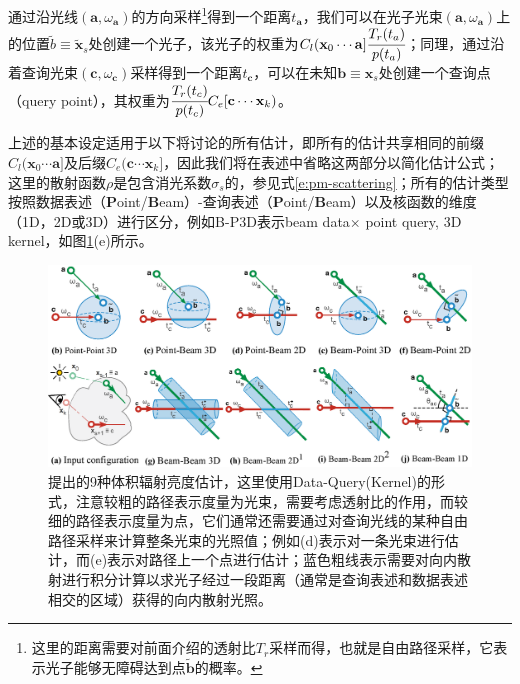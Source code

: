 通过沿光线$(\mathbf{a},\omega_{\mathbf{a}})$的方向采样\footnote{这里的距离需要对前面介绍的透射比$T_r$采样而得，也就是自由路径采样，它表示光子能够无障碍达到点$\tilde{\mathbf{b}}$的概率。}得到一个距离$t_{\mathbf{a}}$，我们可以在光子光束$(\mathbf{a},\omega_{\mathbf{a}})$上的位置$\tilde{b}\equiv\tilde{\mathbf{x}}_s$处创建一个光子，该光子的权重为$C_l(\mathbf{x}_0\cdots\mathbf{a}] \cfrac{T_r(t_a)}{p(t_a)}$；同理，通过沿着查询光束$(\mathbf{c},\omega_{\mathbf{c}})$采样得到一个距离$t_{\mathbf{c}}$，可以在未知$\mathbf{b}\equiv\mathbf{x}_s$处创建一个查询点（query point），其权重为$ \cfrac{T_r(t_c)}{p(t_c)}C_e[\mathbf{c}\cdots\mathbf{x}_k)$。

上述的基本设定适用于以下将讨论的所有估计，即所有的估计共享相同的前缀$C_l(\mathbf{x}_0\cdots\mathbf{a}]$及后缀$C_e(\mathbf{c}\cdots\mathbf{x}_k]$，因此我们将在表述中省略这两部分以简化估计公式；这里的散射函数$\rho$是包含消光系数$\sigma_s$的，参见式\ref{e:pm-scattering}；所有的估计类型按照数据表述（\textbf{P}oint/\textbf{B}eam）-查询表述（\textbf{P}oint/\textbf{B}eam）以及核函数的维度（1D，2D或3D）进行区分，例如B-P3D表示beam data$\times$ point query, 3D kernel，如图\ref{f:pm-estimators}(e)所示。
	
\begin{figure}
\begin{fullwidth}
	\includegraphics[width=1.0\thewidth]{figures/pm/estimators}
	\caption{\cite{a:AComprehensiveTheoryofVolumetricRadianceEstimationusingPhotonPointsandBeams}提出的9种体积辐射亮度估计，这里使用Data-Query(Kernel)的形式，注意较粗的路径表示度量为光束，需要考虑透射比的作用，而较细的路径表示度量为点，它们通常还需要通过对查询光线的某种自由路径采样来计算整条光束的光照值；例如(d)表示对一条光束进行估计，而(e)表示对路径上一个点进行估计；蓝色粗线表示需要对向内散射进行积分计算以求光子经过一段距离（通常是查询表述和数据表述相交的区域）获得的向内散射光照。}
	\label{f:pm-estimators}
\end{fullwidth}
\end{figure}


